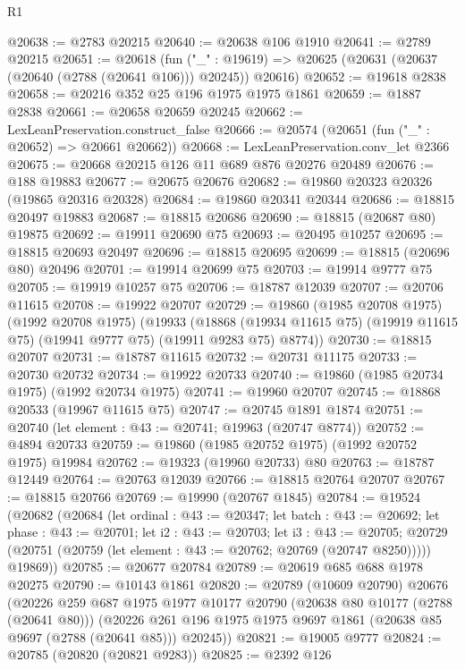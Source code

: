 \begin{lexlean}{R1}
\begin{coremodule}
@20638 := @2783 @20215
@20640 := @20638 @106 @1910
@20641 := @2789 @20215
@20651 := @20618
    (fun ("_" : @19619) => @20625 (@20631 (@20637 (@20640 (@2788 (@20641 @106))) @20245)) @20616)
@20652 := @19618 @2838
@20658 := @20216 @352 @25 @196 @1975 @1975 @1861
@20659 := @1887 @2838
@20661 := @20658 @20659 @20245
@20662 := LexLeanPreservation.construct_false
@20666 := @20574 (@20651 (fun ("_" : @20652) => @20661 @20662))
@20668 := LexLeanPreservation.conv_let @2366
@20675 := @20668 @20215 @126 @11 @689 @876 @20276 @20489
@20676 := @188 @19883
@20677 := @20675 @20676
@20682 := @19860 @20323 @20326 (@19865 @20316 @20328)
@20684 := @19860 @20341 @20344
@20686 := @18815 @20497 @19883
@20687 := @18815 @20686
@20690 := @18815 (@20687 @80) @19875
@20692 := @19911 @20690 @75
@20693 := @20495 @10257
@20695 := @18815 @20693 @20497
@20696 := @18815 @20695
@20699 := @18815 (@20696 @80) @20496
@20701 := @19914 @20699 @75
@20703 := @19914 @9777 @75
@20705 := @19919 @10257 @75
@20706 := @18787 @12039
@20707 := @20706 @11615
@20708 := @19922 @20707
@20729 := @19860
    (@1985 @20708 @1975)
    (@1992 @20708 @1975)
    (@19933
      (@18868 (@19934 @11615 @75) (@19919 @11615 @75) (@19941 @9777 @75) (@19911 @9283 @75) @8774))
@20730 := @18815 @20707
@20731 := @18787 @11615
@20732 := @20731 @11175
@20733 := @20730 @20732
@20734 := @19922 @20733
@20740 := @19860 (@1985 @20734 @1975) (@1992 @20734 @1975)
@20741 := @19960 @20707
@20745 := @18868 @20533 (@19967 @11615 @75)
@20747 := @20745 @1891 @1874
@20751 := @20740 (let element : @43 := @20741; @19963 (@20747 @8774))
@20752 := @4894 @20733
@20759 := @19860 (@1985 @20752 @1975) (@1992 @20752 @1975) @19984
@20762 := @19323 (@19960 @20733) @80
@20763 := @18787 @12449
@20764 := @20763 @12039
@20766 := @18815 @20764 @20707
@20767 := @18815 @20766
@20769 := @19990 (@20767 @1845)
@20784 := @19524
    (@20682
      (@20684
        (let ordinal : @43 := @20347;
        let batch : @43 := @20692;
        let phase : @43 := @20701;
        let i2 : @43 := @20703;
        let i3 : @43 := @20705;
        @20729 (@20751 (@20759 (let element : @43 := @20762; @20769 (@20747 @8250)))))
        @19869))
@20785 := @20677 @20784
@20789 := @20619 @685 @688 @1978 @20275
@20790 := @10143 @1861
@20820 := @20789
    (@10609 @20790)
    @20676
    (@20226
      @259
      @687
      @1975
      @1977
      @10177
      @20790
      (@20638 @80 @10177 (@2788 (@20641 @80)))
      (@20226 @261 @196 @1975 @1975 @9697 @1861 (@20638 @85 @9697 (@2788 (@20641 @85))) @20245))
@20821 := @19005 @9777
@20824 := @20785 (@20820 (@20821 @9283))
@20825 := @2392 @126

\end{coremodule}
\end{lexlean}
